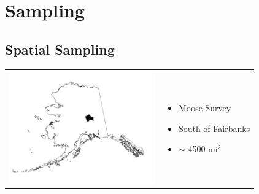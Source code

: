 \documentclass[mathserif,compress]{beamer}\usepackage{graphicx, color}
\begin{document}

\section{Sampling}
\subsection{Spatial Sampling}
\begin{frame} 
     
	\begin{tabular} {p{6cm} p{3cm}}
		\vspace{.1cm} \includegraphics[width=6.3cm]{figure/mooseSurvey20A.jpg}  &
	
		\begin{itemize}
			\item Moose Survey
			\item South of Fairbanks
			\item $\sim$ 4500 mi$^2$
		\end{itemize}

	\end{tabular}

\end{frame}

\end{document}
